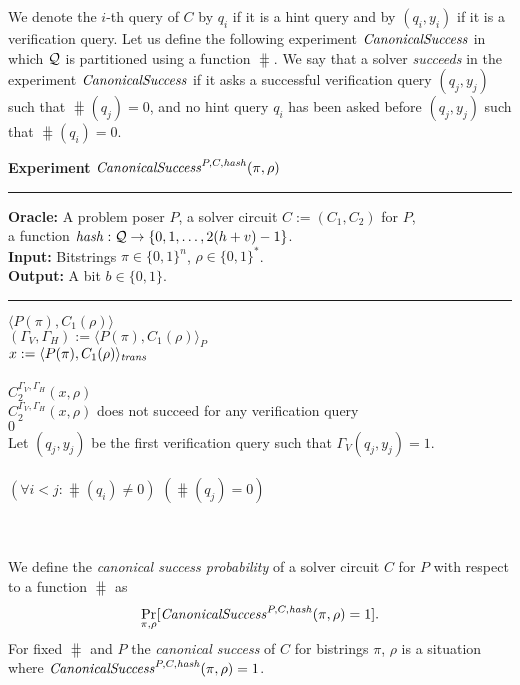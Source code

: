 We denote the $i$-th query of $C$ by $q_i$ if it is a hint query and by $(q_i, y_i)$ if it is a verification query.
Let us define the following experiment $\operatorname{\mathit{CanonicalSuccess}}$ in which $\mathcal{Q}$ is partitioned using a function $\hash$.
We say that a solver \textit{succeeds} in the experiment $\operatorname{\mathit{CanonicalSuccess}}$
if it asks a successful verification query $(q_j, y_j)$ such that $\hash(q_j) = 0$,
and no hint query $q_i$ has been asked before $(q_j, y_j)$ such that $\hash(q_i) = 0$.
%
\begin{codeblock}
  \textbf{Experiment} $\operatorname{\mathit{CanonicalSuccess}}^{P, C, \operatorname{\mathit{hash}}}(\pi, \rho)$
  \medskip \hrule
  \textbf{Oracle:} A problem poser $P$, a solver circuit $C := (C_1, C_2)$ for $P$,\\
  \IndII a function $\operatorname{\mathit{hash}}: \mathcal{Q} \rightarrow \{0, 1, \dotsc, 2(h+v) - 1\}$.\\
  \textbf{Input:}  Bitstrings $\pi \in \{0,1\}^n$, $\rho \in \{0,1\}^*$. \\
  \textbf{Output:} A bit $b \in \{0,1\}$.
  \medskip\hrule
  \Run $\langle P(\pi), C_1(\rho) \rangle$ \\
  \IndI $(\Gamma_V, \Gamma_H) := \langle P(\pi), C_1(\rho) \rangle_{P}$ \\
  \IndI $x := \langle P(\pi), C_1(\rho) \rangle_{\operatorname{\mathit{trans}}}$ \\ \\
  \Run $C_2^{\Gamma_V, \Gamma_H} (x, \rho)$ \\
  \IndI \If $C_2^{\Gamma_V, \Gamma_H} (x, \rho)$ does not succeed for any verification query \Then \\
  \IndII \Return $0$ \\
  \IndI Let $(q_j,y_j)$ be the first verification query such that $\Gamma_V(q_j, y_j) = 1$.\\
  \\
  \If $(\forall i < j :  \hash(q_i) \neq 0)$ \And $(\hash(q_j) = 0)$ \Then \\
  \IndI {}\\
  \Else\\
  \IndI {}
\end{codeblock}
%
We define the \textit{canonical success probability} of a solver circuit $C$ for $P$ with respect to a function $\hash$ as
\begin{align}
 \underset{\pi, \rho}{\Pr}[\operatorname{\mathit{CanonicalSuccess}}^{P, C, \operatorname{\mathit{hash}}}(\pi, \rho) = 1].
\end{align}
%
For fixed $\hash$ and $P$ the \textit{canonical success} of $C$ for bistrings $\pi$, $\rho$ is a situation where
$\operatorname{\mathit{CanonicalSuccess}}^{P, C, \operatorname{\mathit{hash}}}(\pi, \rho) = 1$.


